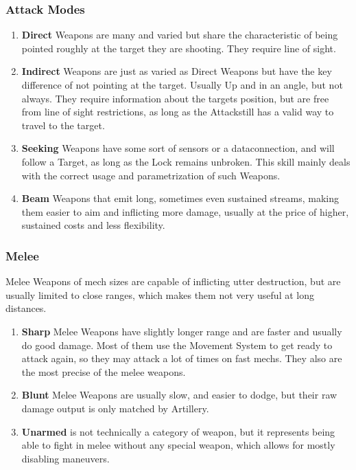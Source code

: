 \subsubsection{Attack Modes}
\begin{enumerate}[label= -]
    \item \textbf{Direct} Weapons are many and varied but share the characteristic of being pointed roughly at
    the target they are shooting.
    They require line of sight.
    \item \textbf{Indirect} Weapons are just as varied as Direct Weapons but have the key difference
    of not pointing at the target.
    Usually Up and in an angle, but not always.
    They require information about the targets position, but are free from line of sight restrictions, as long as
    the Attackstill has a valid way to travel to the target.
    \item \textbf{Seeking} Weapons have some sort of sensors or a dataconnection, and will follow a Target, as long as the Lock
    remains unbroken.
    This skill mainly deals with the correct usage and parametrization of such Weapons.
    \item \textbf{Beam} Weapons that emit long, sometimes even sustained streams, making them easier to aim
    and inflicting more damage, usually at the price of higher, sustained costs and less flexibility.
\end{enumerate}
\subsubsection{Melee}
Melee Weapons of mech sizes are capable of inflicting utter destruction, but are usually
limited to close ranges, which makes them not very useful at long distances.
\begin{enumerate}[label= -]
    \item \textbf{Sharp} Melee Weapons have slightly longer range and are faster and usually do good damage.
    Most of them use the Movement System to get ready to attack again, so they may attack a lot of times on fast mechs.
    They also are the most precise of the melee weapons.
    \item \textbf{Blunt} Melee Weapons are usually slow, and easier to dodge, but their raw damage output is only
    matched by Artillery.
    \item \textbf{Unarmed} is not technically a category of weapon, but it represents being able to fight in melee
    without any special weapon, which allows for mostly disabling maneuvers.
\end{enumerate}

